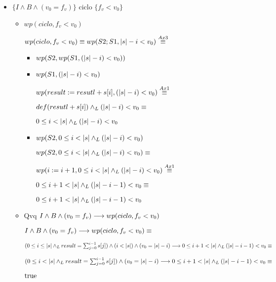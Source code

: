 \documentclass{article}
\begin{document}
\begin{itemize}
    \item $\{I \wedge B \wedge (v_{0} = f_{v})\}$ ciclo $\{f_{v} < v_{0}\}$

        \begin{itemize}
            \item $wp(ciclo, f_{v} < v_{0})$

                $wp(ciclo, f_{v} < v_{0}) \equiv wp(S2;S1, |s| - i < v_{0}) \stackrel{Ax3}{\equiv}$ 
    
            \begin{itemize}
                \item $wp(S2, wp(S1, (|s| - i) < v_{0}))$

                \item $wp(S1, (|s| - i) < v_{0})$

                    $wp(result := resutl + s[i], (|s|-i) < v_{0}) \stackrel{Ax1}{\equiv}$

                    $def(resutl + s[i]) \land _L (|s|-i) < v_{0} \equiv$

                    $ 0 \leq i < |s| \land _L (|s|-i) < v_{0}$

                \item $wp(S2, 0 \leq i < |s| \land _L (|s|-i) < v_{0})$
                
                    $wp(S2, 0 \leq i < |s| \land _L (|s|-i) < v_{0}) \equiv$

                    $wp(i := i+1, 0 \leq i < |s| \land _L (|s|-i) < v_{0}) \stackrel{Ax1}{\equiv}$

                    $0 \leq i+1 < |s| \land _L (|s|-i-1) < v_{0} \equiv$

                    $0 \leq i+1 < |s| \land _L (|s|-i-1) < v_{0}$
            \end{itemize}

            \item Qvq $I \wedge B \wedge (v_{0} = f_{v}) \longrightarrow wp(ciclo, f_{v} < v_{0})$

                $I \wedge B \wedge (v_{0} = f_{v}) \longrightarrow wp(ciclo, f_{v} < v_{0}) \equiv$

                $(0 \leq i \leq |s| \land _L result = \sum_{j=0}^{i-1} s[j]) \wedge
                    (i < |s|) \wedge (v_{0} = |s| - i) \longrightarrow
                    0 \leq i+1 < |s| \land _L (|s|-i-1) < v_{0} \equiv$

                $(0 \leq i < |s| \land _L result = \sum_{j=0}^{i-1} s[j]) \wedge
                    (v_{0} = |s| - i) \longrightarrow
                    0 \leq i+1 < |s| \land _L (|s|-i-1) < v_{0}  \equiv$

                $\mathrm{true}$

        \end{itemize}

\end{itemize}
\end{document}
